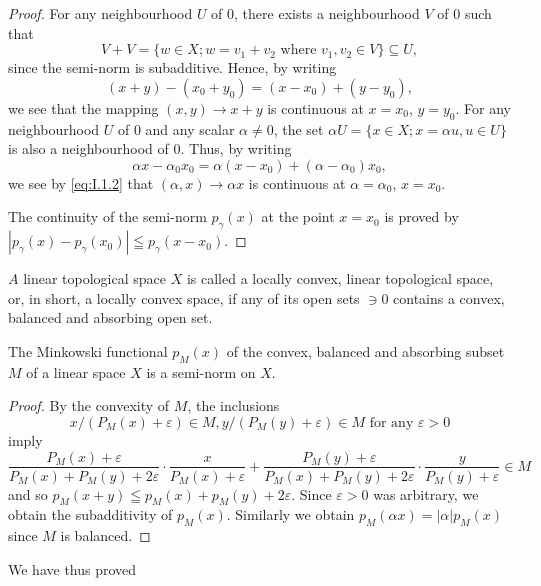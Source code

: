 \begin{proof}
 For any neighbourhood $U$ of $0$, there exists a neighbourhood $V$ of $0$ such that 
\[
V + V = \{w \in X; w = v_{1} + v_{2} \text{ where } v_{1}, v_{2} \in V \} \subseteq U,
\]
since the semi-norm is subadditive. Hence, by writing 
\[
(x + y)- (x_{0} + y_{0}) = (x- x_{0}) + (y- y_{0}),
\]
we see that the mapping $(x, y) \to x + y$ is continuous at $x = x_0$, $y = y_0$. For any neighbourhood $U$ of $0$ and any scalar $\alpha \neq 0$, the set $\alpha U = \{x \in X; x = \alpha u, u \in U\}$ is also a neighbourhood of $0$. Thus, by writing 
\[
\alpha x- \alpha_{0} x_{0} = \alpha (x- x_{0}) + (\alpha- \alpha_{0}) x_{0},
\]
we see by \eqref{eq:I.1.2} that $(\alpha, x) \to \alpha x$ is continuous at $\alpha = \alpha_0$, $x = x_0$. 

The continuity of the semi-norm $p_{\gamma}(x)$ at the point $x = x_{0}$ is proved by $|p_{\gamma}(x)- p_{\gamma}(x_{0})| \leqq p_{\gamma}(x- x_{0})$. 
\end{proof}

\begin{definition}\label{def:I.1.Definition.3} $A$ linear topological space $X$ is called a locally convex, linear topological space, or, in short, a locally convex space, if any of its open sets $\ni0$ contains a convex, balanced and absorbing open set. 
\end{definition}

\begin{proposition}\label{prop:I.1.Proposition.5} The Minkowski functional $p_{M}(x)$ of the convex, balanced and absorbing subset $M$ of a linear space $X$ is a semi-norm on $X$. 
\end{proposition}

\begin{proof}
 By the convexity of $M$, the inclusions \[
 x / (P_{M} (x) + \varepsilon) \in M, y / (P_{M} (y) + \varepsilon) \in M \text{ for any } \varepsilon > 0
 \]
 imply 
 \[
 \frac {P_{M} (x) + \varepsilon}{P_{M} (x) + P_{M} (y) + 2 \varepsilon} \cdot \frac {x}{P_{M} (x) + \varepsilon} + \frac {P_{M} (y) + \varepsilon}{P_{M} (x) + P_{M} (y) + 2 \varepsilon} \cdot \frac {y}{P_{M} (y) + \varepsilon} \in M
 \]
 and so $p_{M}(x+y)\leqq p_{M}(x)+p_{M}(y)+2\varepsilon$. Since $\varepsilon>0$ was arbitrary, we obtain the subadditivity of $p_{M}(x)$. Similarly we obtain $p_{M}(\alpha x)=|\alpha|p_{M}(x)$ since $M$ is balanced. 
\end{proof}

We have thus proved 


